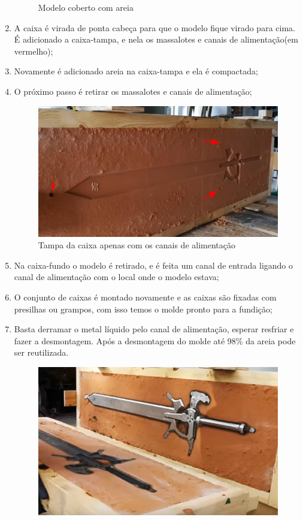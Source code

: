 \documentclass[a4paper, 12pt]{article}
\begin{document}
\begin{enumerate}
\begin{figure}[h]
			\caption{Modelo coberto com areia}
		\end{figure}
		\item A caixa é virada de ponta cabeça para que o modelo fique virado para cima. É adicionado a caixa-tampa, e nela os massalotes e canais de alimentação(em vermelho);
		\item Novamente é adicionado areia na caixa-tampa e ela é compactada;
		\item O próximo passo é retirar os massalotes e canais de alimentação;
		\begin{figure}[h]
			\centering
			\includegraphics[scale=0.5]{a2.png}
			\caption{Tampa da caixa apenas com os canais de alimentação}
		\end{figure}
		\item Na caixa-fundo o modelo é retirado, e é feita um canal de entrada ligando o canal de alimentação com o local onde o modelo estava;
		\item O conjunto de caixas é montado novamente e as caixas são fixadas com presilhas ou grampos, com isso temos o molde pronto para a fundição;
		\item Basta derramar o metal líquido pelo canal de alimentação, esperar resfriar e fazer a desmontagem. Após a desmontagem do molde até 98\% da areia pode ser reutilizada.
		\begin{figure}[h]
			\centering
			\includegraphics[scale=0.5]{a3.png}

\end{figure}
\end{enumerate}
\end{document}
